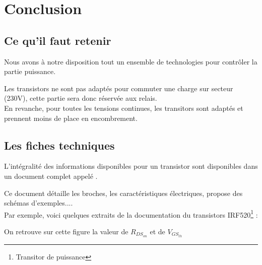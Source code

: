 

 \chapter{Conclusion}

 \section{Ce qu'il faut retenir}

 
 Nous avons à notre disposition tout un ensemble de technologies pour contrôler la partie puissance.

 Les transistors ne sont pas adaptés pour commuter une charge sur secteur (230V), cette partie sera donc réservée aux relais.\\
 En revanche, pour toutes les tensions continues, les transitors sont adaptés et prennent moins de place en encombrement.\\

 \section{Les fiches techniques}

 L'intégralité des informations disponibles pour un transistor sont disponibles dans un document complet appelé .

 Ce document détaille les broches, les caractéristiques électriques, propose des schémas d'exemples....\\

 Par exemple, voici quelques extraits de la documentation du transistors IRF520\footnote{Transitor de puissance} :



 On retrouve sur cette figure la valeur de $R_{DS_{on}}$ et de $V_{GS_{th}}$

